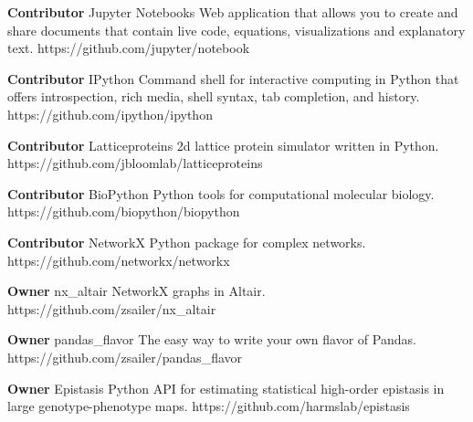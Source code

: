 \begin{cvossoftware}

  \cvoss
    {\textbf{Contributor} Jupyter Notebooks} %
    {Web application that allows you to create and share documents that contain live code, equations, visualizations and explanatory text.} %
    {https://github.com/jupyter/notebook} %

  \cvoss
    {\textbf{Contributor} IPython} %
    {Command shell for interactive computing in Python that offers introspection, rich media, shell syntax, tab completion, and history.}
    {https://github.com/ipython/ipython} %

  \cvoss
    {\textbf{Contributor} Latticeproteins} %
    {2d lattice protein simulator written in Python.}
    {https://github.com/jbloomlab/latticeproteins} %

  \cvoss
    {\textbf{Contributor} BioPython} %
    {Python tools for computational molecular biology.}
    {https://github.com/biopython/biopython} %

  \cvoss
    {\textbf{Contributor} NetworkX} %
    {Python package for complex networks.}
    {https://github.com/networkx/networkx} %

  \cvoss
    {\textbf{Owner} nx\_altair} %
    {NetworkX graphs in Altair.}
    {https://github.com/zsailer/nx\_altair} %

  \cvoss
    {\textbf{Owner} pandas\_flavor} %
    {The easy way to write your own flavor of Pandas.}
    {https://github.com/zsailer/pandas\_flavor} %

  \cvoss
    {\textbf{Owner} Epistasis} %
    {Python API for estimating statistical high-order epistasis in large genotype-phenotype maps.}
    {https://github.com/harmslab/epistasis} %


\end{cvossoftware}
